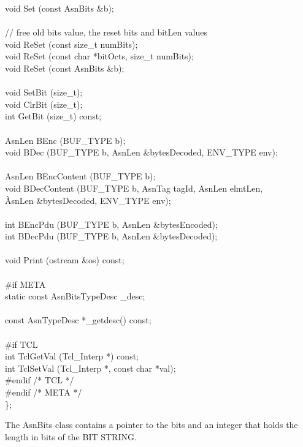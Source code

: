 \begin{Ccode}
  void				\>\>Set (const AsnBits \&b);\\
\\
  // free old bits value, the reset bits and bitLen values\\
  void				\>\>ReSet (const size\_t numBits);\\
  void				\>\>ReSet (const char *bitOcts, size\_t numBits);\\
  void				\>\>ReSet (const AsnBits \&b);\\
\\
  void				\>\>SetBit (size\_t);\\
  void				\>\>ClrBit (size\_t);\\
  int				\>\>GetBit (size\_t) const;\\
\\
  AsnLen			\>\>BEnc (BUF\_TYPE b);\\
  void				\>\>BDec (BUF\_TYPE b, AsnLen \&bytesDecoded, ENV\_TYPE env);\\
\\
  AsnLen			\>\>BEncContent (BUF\_TYPE b);\\
  void				\>\>BDecContent (BUF\_TYPE b, AsnTag tagId, AsnLen elmtLen,\\
					\`AsnLen \&bytesDecoded, ENV\_TYPE env);\\
\\
  int				\>\>BEncPdu (BUF\_TYPE b, AsnLen \&bytesEncoded);\\
  int				\>\>BDecPdu (BUF\_TYPE b, AsnLen \&bytesDecoded);\\
\\
  void				\>\>Print (ostream \&os) const;\\
\\
\<\#if META\\
  static const AsnBitsTypeDesc	\>\>\_desc;\\
\\
  const AsnTypeDesc		\>\>*\_getdesc() const;\\
\\
\<\#if TCL\\
  int				\>\>TclGetVal (Tcl\_Interp *) const;\\
  int				\>\>TclSetVal (Tcl\_Interp *, const char *val);\-\\
\#endif /* TCL */\\
\#endif /* META */\\
\};
\end{Ccode}

The {\C AsnBits} class contains a pointer to the bits and an
integer that holds the length in bits of the BIT STRING\@.

